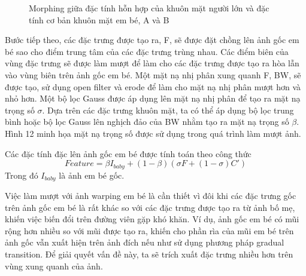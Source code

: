 \documentclass[journal]{IEEEtran}
\begin{document}
\begin{figure}[!t]
\label{refhinh11}
\caption{Morphing giữa đặc tính hỗn hợp của khuôn mặt người lớn và đặc tính cơ bản khuôn mặt em bé, A và B}
\end{figure}
Bước tiếp theo, các đặc trưng được tạo ra, F, sẽ được đặt chồng lên ảnh gốc em bé sao cho điểm trung tâm của các đặc trưng trùng nhau. Các điểm biên của vùng đặc trưng sẽ được làm mượt để làm cho các đặc trưng được tạo ra hòa lẫn vào vùng biên trên ảnh gốc em bé. Một mặt nạ nhị phân xung quanh F, BW, sẽ được tạo, sử dụng open filter và erode để làm cho mặt nạ nhị phân mượt hơn và nhỏ hơn. Một bộ lọc Gauss được áp dụng lên mặt nạ nhị phân để tạo ra mặt nạ trọng số $\sigma$. Dựa trên các đặc trưng khuôn mặt, ta có thể áp dụng bộ lọc trung bình hoặc bộ lọc Gauss lên nghịch đảo của BW nhằm tạo ra mặt nạ trọng số $\beta$. Hình 12 minh họa mặt nạ trọng số được sử dụng trong quá trình làm mượt ảnh.  

Các đặc tính đặc lên ảnh gốc em bé được tính toán theo công thức \[Feature = \beta I_{baby}+(1 - \beta )(\sigma F+(1-\sigma )C')\]
Trong đó $I_{baby}$ là ảnh em bé gốc.

Việc làm mượt với ảnh warping em bé là cần thiết vì đôi khi các đặc trưng gốc trên ảnh gốc em bé là rất khác so với các đặc trưng được tạo ra từ ảnh bố mẹ, khiến việc biến đổi trên đường viên gặp khó khăn. Ví dụ, ảnh gốc em bé có mũi rộng hơn nhiều so với mũi được tạo ra, khiến cho phần rìa của mũi em bé trên ảnh gốc vẫn xuất hiện trên ảnh đích nếu như sử dụng phương pháp gradual transition. Để giải quyết vấn đề này, ta sẽ trích xuất đặc trưng nhiều hơn trên vùng xung quanh của ảnh.
\end{document}
